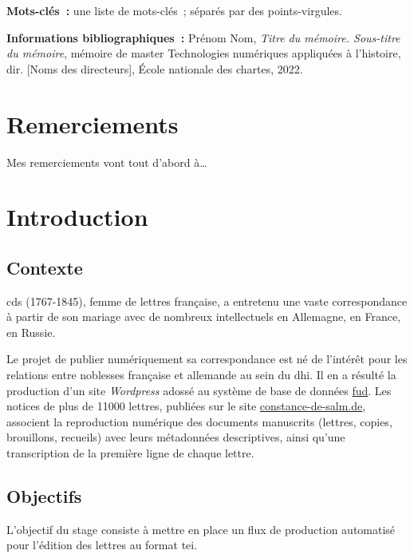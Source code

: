 \documentclass[a4paper,12pt,twoside]{book}
\begin{document}
		\textbf{Mots-clés~:} une liste de mots-clés~; séparés par des points-virgules.
		
		\textbf{Informations bibliographiques~:} Prénom Nom, \textit{Titre du mémoire. Sous-titre du mémoire}, mémoire de master \og{}Technologies numériques appliquées à l'histoire\fg{}, dir. [Noms des directeurs], École nationale des chartes, 2022.
		
		\thispagestyle{empty}	
		\cleardoublepage
	
	\chapter*{Remerciements}
	
		Mes remerciements vont tout d'abord à\dots
		
		\thispagestyle{empty}	
		\cleardoublepage
		
	\tableofcontents
	
		\thispagestyle{empty}	
		\cleardoublepage
		
	\mainmatter
	
	\chapter*{Introduction}
	
		\section*{Contexte}
			\gls{cds} (1767-1845), femme de lettres française, a entretenu une vaste correspondance à partir de son mariage avec de nombreux intellectuels en Allemagne, en France, en Russie.
	
			Le projet de publier numériquement sa correspondance est né de l'intérêt pour les relations entre noblesses française et allemande au sein du \gls{dhi}. Il en a résulté la production d'un site \textit{Wordpress} adossé au système de base de données \href{https://fud.uni-trier.de/}{\gls{fud}}. Les notices de plus de 11000 lettres, publiées sur le site \href{https://constance-de-salm.de}{constance-de-salm.de}, associent la reproduction numérique des documents manuscrits (lettres, copies, brouillons, recueils) avec leurs métadonnées descriptives, ainsi qu'une transcription de la première ligne de chaque lettre.
	
		\section*{Objectifs}
			L'objectif du stage consiste à mettre en place un flux de production automatisé pour l'édition des lettres au format \gls{tei}. 
			
\end{document}
